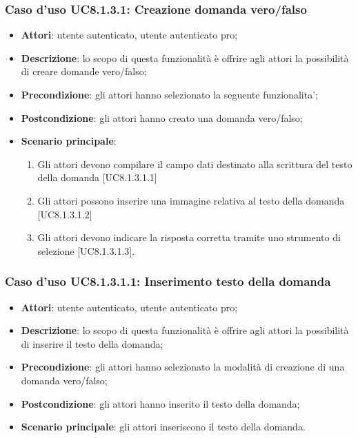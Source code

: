 \subsubsection{Caso d'uso UC8.1.3.1: Creazione domanda vero/falso}
	\begin{itemize}
		\item
			\textbf{Attori}: utente autenticato, utente autenticato pro;
		\item		
			\textbf{Descrizione}: lo scopo di questa funzionalità è offrire agli attori la possibilità di creare domande vero/falso;
		\item
			\textbf{Precondizione}: gli attori hanno selezionato la seguente funzionalita'; 
		\item
			\textbf{Postcondizione}: gli attori hanno creato una domanda vero/falso;
		\item
			\textbf{Scenario principale}:
	       		\begin{enumerate}
	       			\item
	       			Gli attori devono compilare il campo dati destinato alla scrittura del testo della domanda [UC8.1.3.1.1]
	       			\item
	       			Gli attori possono inserire una immagine relativa al testo della domanda [UC8.1.3.1.2]
					\item
					Gli attori devono indicare la risposta corretta tramite uno strumento di selezione [UC8.1.3.1.3].
	 			\end{enumerate}
	\end{itemize}

\subsubsection{Caso d'uso UC8.1.3.1.1: Inserimento testo della domanda}
	\begin{itemize}
		\item
			\textbf{Attori}: utente autenticato, utente autenticato pro;
		\item		
			\textbf{Descrizione}: lo scopo di questa funzionalità è offrire agli attori la possibilità di inserire il testo della domanda;
		\item
			\textbf{Precondizione}: gli attori hanno selezionato la modalità di creazione di una domanda vero/falso; 
		\item
			\textbf{Postcondizione}: gli attori hanno inserito il testo della domanda;
		\item
			\textbf{Scenario principale}: gli attori inseriscono il testo della domanda. 
	 			
	\end{itemize}
	
